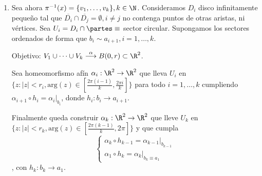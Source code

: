 {\begin{enumerate}
        Existen homeomorfismos $\alpha_i : \R^2 \to \R^2$ (de hecho aplicaciones afines) tales que: 
        \[\alpha_1(U_1) = \{z\in \mathbb{C} : |z| < r_1, \text{Im}(z) \ge 0\} = \{(x,y)\in\R^2 : \|(x,y)\| < r_1, y \ge 0\}\]
        \[\alpha_2(U_2) = \{z\in \mathbb{C} : |z| < r_2, \text{Im}(z) \le 0\}\]
        y también que $\alpha_2 \circ h = \alpha_1|_a$.
        
        Sea $r = \min\{r_1, r_2\}$ y llamo $V_1 = \alpha^{-1}(\{z : |z|<r, \text{Im}(z) \ge 0\})$ y $V_2 = \alpha^{-1}(\{z : |z|<r, \text{Im}(z) \le 0\})$. Lo que hemos llamado $A = V_1 \cup V_2$ abierto de $\partes$. $\alpha : V_1 \cup V_2 \to B(0,r)$ identificación (continua, cerrada, sobreyectiva) donde $\alpha(x) = \begin{cases}
            \alpha_1(x) & x \in V_1 \\
            \alpha_2(x) & x \in V_2
        \end{cases}$. Está bien definida y pasa al cociente porque $xRy, x\in a, y \in a' \implies y = h(x)$ y entonces $\alpha(y) = \alpha_2(y) = \alpha_2(h(x)) = \alpha_1(x) = \alpha(x)$. %
        \item Sea ahora $\pi^{-1}(x) = \{v_1, \dots, v_k\}, k \in \N$. Consideramos $D_i$ disco infinitamente pequeño tal que $\overline{D_i} \cap \overline{D_j} = \emptyset, i \neq j$ no contenga puntos de otras aristas, ni vértices. 
        Sea $U_i = D_i \cap \partes \equiv$ sector circular. Supongamos los sectores ordenados de forma que $b_i \sim a_{i+1}, i=1,\dots,k$.

        Objetivo: $V_1 \cup \dots \cup V_k \overset{\alpha}{\longrightarrow} B(0,r) \subset \R^2$. 

        Sea homeomorfismo afín $\alpha_i : \R^2 \to \R^2$ que lleva $U_i$ en $\{z : |z| < r_i, \text{arg}(z) \in [\frac{2\pi(i-1)}{k}, \frac{2\pi i}{k}]\}$ para todo $i=1,\dots,k$ cumpliendo $\alpha_{i+1} \circ h_i = \alpha_i|_{b_i}$, donde $h_i : b_i \to a_{i+1}$.
        
        Finalmente queda construir $\alpha_k : \R^2 \to \R^2$ que lleve $U_k$ en $\{z : |z| < r_k, \text{arg}(z) \in [\frac{2\pi(k-1)}{k}, 2\pi]\}$ y que cumpla 
        \begin{equation}
            \label{5.3-casos} \begin{cases}
                \alpha_k \circ h_{k-1} = \alpha_{k-1}|_{b_{k-1}} \\
                \alpha_1 \circ h_k = \alpha_k|_{b_k \equiv a_1}
            \end{cases}
        \end{equation}, con $h_k : b_k \to a_1$.
        

\end{enumerate}}
